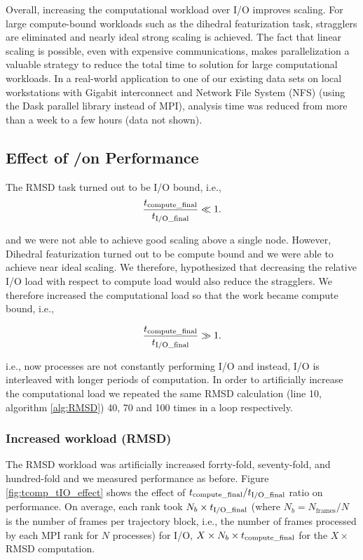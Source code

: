 Overall, increasing the computational workload over I/O improves scaling. For large compute-bound workloads such as the dihedral
featurization task, stragglers are eliminated and nearly ideal strong scaling is achieved. 
The fact that linear scaling is possible, even with expensive communications, makes parallelization a valuable strategy to reduce
the total time to solution for large computational workloads. In a real-world application to one of our existing data sets on local
workstations with Gigabit interconnect and Network File System (NFS) (using the Dask parallel library instead of MPI), analysis time was reduced from more
than a week to a few hours (data not shown).

\subsection{Effect of \tcomp/\tIO on Performance}
\label{bound}

The RMSD task turned out to be I/O bound, i.e.,
\begin{gather*}
  \frac{{t}_{\text{compute\_final}}}{{t}_{\text{I/O\_final}}} \ll 1.
\end{gather*}

and we were not able to achieve good scaling above a single node. 
However, Dihedral featurization turned out to be compute bound and we were able to achieve near ideal scaling. 
We therefore, hypothesized that decreasing the relative I/O load with respect to compute load would also reduce the stragglers. 
We therefore increased the computational load so that the work became compute bound, i.e.,

\begin{gather*}
  \frac{{t}_{\text{compute\_final}}}{{t}_{\text{I/O\_final}}} \gg 1.
\end{gather*}

i.e., now processes are not constantly performing I/O and instead, I/O is interleaved with longer periods of computation.
In order to artificially increase the computational load we repeated the same RMSD calculation (line 10, algorithm \ref{alg:RMSD}) 40, 70 and 100 times in a loop respectively.

\subsubsection{Increased workload (RMSD)}
The RMSD workload was artificially increased forrty-fold, seventy-fold, and hundred-fold and we measured performance as before. 
Figure \ref{fig:tcomp_tIO_effect} shows the effect of ${t}_{\text{compute\_final}}/{t}_{\text{I/O\_final}}$ ratio on performance.
On average, each rank took $N_{b} \times {t}_{\text{I/O\_final}} $ (where $N_{b}=N_{\text{frames}}/N$ is the
number of frames per trajectory block, i.e., the number of frames
processed by each MPI rank for $N$ processes) for I/O,
$X \times N_{b} \times {t}_{\text{compute\_final}}$ for the $X\times$ RMSD computation.

